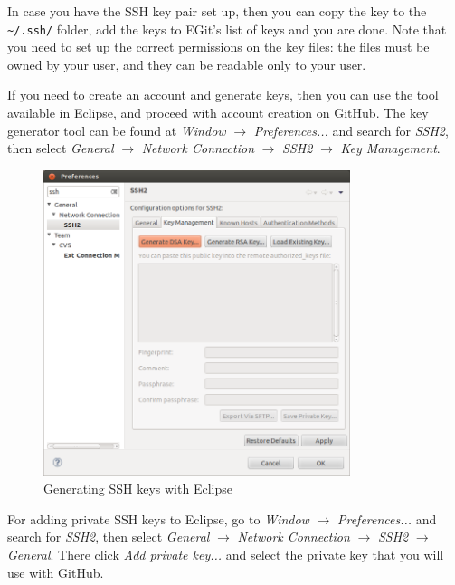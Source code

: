 \documentclass[a4paper, 10pt]{article}
\begin{document}
In case you have the SSH key pair set up, then you can copy the key to
the \verb+~/.ssh/+ folder,
add the keys to EGit's list of keys and you are done.
Note that you need to set up the correct permissions on the key files:
the files must be owned by your user, and they can be readable only to
your user.

If you need to create an account and generate keys, then you can use the
tool available in Eclipse, and proceed with account creation on GitHub.
The key generator tool can be found at
\emph{Window} $\rightarrow$ \emph{Preferences...}
and search for \emph{SSH2}, then select
\emph{General} $\rightarrow$ \emph{Network Connection} $\rightarrow$
\emph{SSH2} $\rightarrow$ \emph{Key Management}.

    \begin{figure}[H]
    \centering
        \includegraphics[width=0.8\textwidth]{./install-guide-linux-images/auth-generate.png}
        \caption{Generating SSH keys with Eclipse}
        \label{fig:auth-generate}
    \end{figure}

For adding private SSH keys to Eclipse, go to
\emph{Window} $\rightarrow$ \emph{Preferences...}
and search for \emph{SSH2}, then select
\emph{General} $\rightarrow$ \emph{Network Connection} $\rightarrow$
\emph{SSH2} $\rightarrow$ \emph{General}.
There click \emph{Add private key...} and select the private key that you
will use with GitHub.
\end{document}
